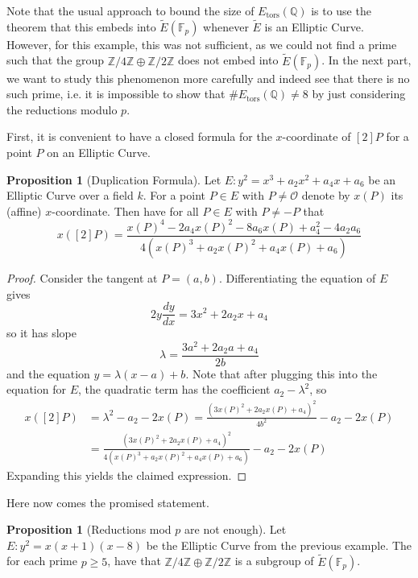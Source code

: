 \documentclass{scrartcl}
\newcommand{\Z}{\mathbb{Z}}
\newcommand{\F}{\mathbb{F}}
\newcommand{\Q}{\mathbb{Q}}
\renewcommand{\O}{\mathcal{O}}
\theoremstyle{definition}
\newtheorem{prop}[subsection]{Proposition}
\begin{document}
Note that the usual approach to bound the size of $E_{\mathrm{tors}}(\Q)$ is to use the theorem that this embeds into $\tilde{E}(\F_p)$ whenever $\tilde{E}$ is an Elliptic Curve.
However, for this example, this was not sufficient, as we could not find a prime such that the group $\Z/4\Z \oplus \Z/2\Z$ does not embed into $\tilde{E}(\F_p)$.
In the next part, we want to study this phenomenon more carefully and indeed see that there is no such prime, i.e. it is impossible to show that $\#E_{\mathrm{tors}}(\Q) \neq 8$ by just considering the reductions modulo $p$.

First, it is convenient to have a closed formula for the $x$-coordinate of $[2]P$ for a point $P$ on an Elliptic Curve.
\begin{prop}[Duplication Formula]
    \label{prop:duplication_formula}
    Let $E: y^2 = x^3 + a_2 x^2 + a_4 x + a_6$ be an Elliptic Curve over a field $k$.
    For a point $P \in E$ with $P \neq \O$ denote by $x(P)$ its (affine) $x$-coordinate.
    Then have for all $P \in E$ with $P \neq -P$ that
    \begin{equation*}
        x([2]P) = \frac {x(P)^4 - 2a_4 x(P)^2 - 8a_6x(P) + a_4^2 - 4a_2a_6} {4(x(P)^3 + a_2 x(P)^2 + a_4 x(P) + a_6)}
    \end{equation*}  
\end{prop}
\begin{proof}
    Consider the tangent at $P = (a, b)$.
    Differentiating the equation of $E$ gives
    \begin{equation*}
        2y\frac {dy} {dx} = 3x^2 + 2a_2x + a_4
    \end{equation*}
    so it has slope
    \begin{equation*}
        \lambda = \frac {3a^2 + 2a_2a + a_4} {2b}
    \end{equation*}
    and the equation $y = \lambda (x - a) + b$.
    Note that after plugging this into the equation for $E$, the quadratic term has the coefficient $a_2 - \lambda^2$, so
    \begin{align*}
        x([2]P) &= \lambda^2 - a_2 - 2 x(P) = \frac {(3x(P)^2 + 2a_2x(P) + a_4)^2} {4b^2} - a_2 - 2 x(P) \\
        &= \frac {(3x(P)^2 + 2a_2x(P) + a_4)^2} {4(x(P)^3 + a_2 x(P)^2 + a_4 x(P) + a_6)} - a_2 - 2 x(P)
    \end{align*}
    Expanding this yields the claimed expression.
\end{proof}
Here now comes the promised statement.
\begin{prop}[Reductions mod $p$ are not enough]
    \label{prop:subgroup_mod_every_p}
    Let $E: y^2 = x(x + 1)(x - 8)$ be the Elliptic Curve from the previous example.
    The for each prime $p \geq 5$, have that $\Z/4\Z \oplus \Z/2\Z$ is a subgroup of $\tilde{E}(\F_p)$.
\end{prop}
\end{document}

